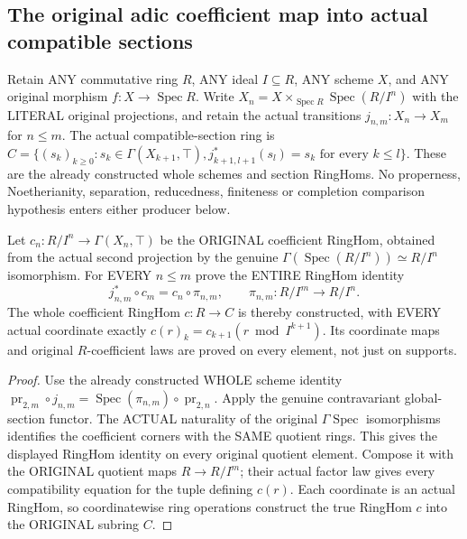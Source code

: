 \subsection{The original adic coefficient map into actual compatible sections}

Retain ANY commutative ring $R$, ANY ideal $I\subseteq R$, ANY scheme
$X$, and ANY original morphism $f:X\to\operatorname{Spec}R$. Write
$X_n=X\times_{\operatorname{Spec}R}\operatorname{Spec}(R/I^n)$ with the
LITERAL original projections, and retain the actual transitions
$j_{n,m}:X_n\to X_m$ for $n\le m$. The actual compatible-section ring is
$C=\{(s_k)_{k\ge0}:s_k\in\Gamma(X_{k+1},\top),
 j_{k+1,l+1}^*(s_l)=s_k\text{ for every }k\le l\}$.
These are the already constructed whole schemes and section RingHoms.
No properness, Noetherianity, separation, reducedness, finiteness or
completion comparison hypothesis enters either producer below.

\begin{theorem}
\label{scheme:actual-original-infinitesimal-coefficient-map}
\leanok
{}
Let $c_n:R/I^n\to\Gamma(X_n,\top)$ be the ORIGINAL coefficient RingHom,
obtained from the actual second projection by the genuine
$\Gamma(\operatorname{Spec}(R/I^n))\simeq R/I^n$ isomorphism. For EVERY
$n\le m$ prove the ENTIRE RingHom identity
\[
 j_{n,m}^*\circ c_m=c_n\circ\pi_{n,m},
 \qquad \pi_{n,m}:R/I^m\to R/I^n.
\]
The whole coefficient RingHom $c:R\to C$ is thereby constructed, with
EVERY actual coordinate exactly
$c(r)_k=c_{k+1}(r\bmod I^{k+1})$. Its coordinate maps and original
$R$-coefficient laws are proved on every element, not just on supports.
\end{theorem}
\begin{proof}
Use the already constructed WHOLE scheme identity
$\operatorname{pr}_{2,m}\circ j_{n,m}
 =\operatorname{Spec}(\pi_{n,m})\circ\operatorname{pr}_{2,n}$.
Apply the genuine contravariant global-section functor. The ACTUAL
naturality of the original $\Gamma\operatorname{Spec}$ isomorphisms
identifies the coefficient corners with the SAME quotient rings. This
gives the displayed RingHom identity on every original quotient element.
Compose it with the ORIGINAL quotient maps $R\to R/I^m$; their actual
factor law gives every compatibility equation for the tuple defining
$c(r)$. Each coordinate is an actual RingHom, so coordinatewise ring
operations construct the true RingHom $c$ into the ORIGINAL subring $C$.
\end{proof}

